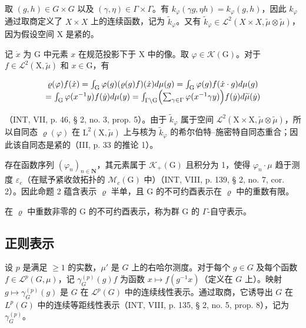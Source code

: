 取 \((g,h) \in G \times G\) 以及 \((\gamma, \eta) \in \Gamma \times \Gamma\)。有 \(k_{\varphi}(\gamma g, \eta h) = k_{\varphi}(g, h)\)，因此 \(k_{\varphi}\) 通过取商定义了 \(X \times X\) 上的连续函数，记为 \(\widetilde{k}_{\varphi}\)。又有 \(\widetilde{k}_{\varphi} \in \mathcal{L}^{2}(X \times X, \widetilde{\mu} \otimes \widetilde{\mu})\)，因为假设空间 X 是紧的。

记 \(\dot{x}\) 为 G 中元素 \(x\) 在规范投影下于 X 中的像。取 \(\varphi \in \mathcal{K}(\mathrm{G})\)。对于 \(f \in \mathcal{L}^2(\mathrm{X},\widetilde{\mu})\) 和 \(x \in \mathrm{G}\)，有

\[
\begin{array}{c} \varrho (\varphi) f (\dot {x}) = \int_ {\mathrm{G}} \varphi (g)   (\varrho (g) f) (\dot {x}) d \mu (g) = \int_ {\mathrm{G}} \varphi (g) f (\dot {x} \cdot g) d \mu (g) \\ = \int_ {\mathrm{G}} \varphi (x ^ {- 1} y) f (\dot {y}) d \mu (y) = \int_ {\Gamma \backslash \mathrm{G}} \Bigl (\sum_ {\gamma \in \Gamma} \varphi (x ^ {- 1} \gamma y) \Bigr) f (\dot {y}) d \widetilde {\mu} (\dot {y}) \end{array}
\]

（INT, VII, p. 46, § 2, no. 3, prop. 5）。由于 \(\widetilde{k}_{\varphi}\) 属于空间 \(\mathcal{L}^2 (\mathrm{X}\times \mathrm{X},\widetilde{\mu}\otimes \widetilde{\mu})\)，所以自同态 \(\varrho (\varphi)\) 在 \(\mathrm{L}^2 (\mathrm{X},\widetilde{\mu})\) 上与核为 \(\widetilde{k}_{\varphi}\) 的希尔伯特–施密特自同态重合；因此该自同态是紧的（III, p. 33 的推论 1）。

存在函数序列 \((\varphi_{n})_{n\in\mathbf{N}}\)，其元素属于 \(\mathcal{K}_{+}(\mathrm{G})\) 且积分为 1，使得 \(\varphi_{n}\cdot\mu\) 趋于测度 \(\varepsilon_{e}\)（在赋予紧收敛拓扑的 \(\mathcal{M}_{c}(\mathrm{G})\) 中）（INT, VIII, p. 139, § 2, no. 7, cor. 2）。因此命题 2 蕴含表示 \(\varrho\) 半单，且 G 的不可约酉表示在 \(\varrho\) 中的重数有限。

在 \(\varrho\) 中重数非零的 G 的不可约酉表示，称为群 G 的 \(\Gamma\)-自守表示。

\subsection{正则表示}

设 \(p\) 是满足 \(\geqslant 1\) 的实数，\(\mu'\) 是 \(G\) 上的右哈尔测度。对于每个 \(g \in G\) 及每个函数 \(f \in \mathcal{L}^p(G, \mu)\)，记 \(\gamma_G^{(p)}(g)f\) 为函数 \(x \mapsto f(g^{-1}x)\)（定义在 \(G\) 上）。映射 \(g \mapsto \gamma_G^{(p)}(g)\) 是 \(G\) 在 \(\mathcal{L}^p(G)\) 中的连续线性表示。通过取商，它诱导出 \(G\) 在 \(L^p(G)\) 中的连续等距线性表示（INT, VIII, p. 135, § 2, no. 5, prop. 8），记为 \(\gamma_G^{(p)}\)。

